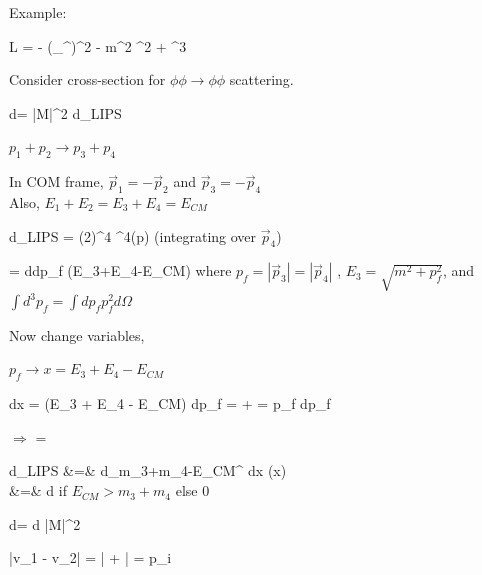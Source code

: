 {\lineacross

Example: 

\be
L = - (\partial_\mu \phi \partial^\mu \phi)^2 - m^2 \phi^2 + \phi^3
\ee

Consider cross-section for $\phi\phi\rightarrow\phi\phi$ scattering.

\be
d\sigma =  |M|^2 d\Pi_{LIPS}
\ee

$p_1 + p_2 \rightarrow p_3 + p_4$


In COM frame,  $\vec{p}_1 = -\vec{p}_2$ and $\vec{p}_3 = -\vec{p}_4$\\
Also, $E_1 + E_2 = E_3+E_4 = E_{CM}$

\be
d\Pi_{LIPS} = (2\pi)^4 \delta^4(\sum p)    
\ee
(integrating over $\vec{p}_4$)

\be
=  d\Omega \int dp_f   \delta(E_3+E_4-E_{CM})
\ee
where $p_f = |\vec{p}_3| = |\vec{p}_4|$ , $E_3 = \sqrt{m^2 + p_f^2}$, and $\int d^3p_f = \int dp_f p_f^2 d\Omega$

Now change variables, 

$p_f \rightarrow x = E_3 + E_4 - E_{CM}$

\be
dx = (E_3 + E_4 - E_{CM}) dp_f =  +   =  p_f dp_f
\ee

$\Rightarrow$
\be
{} = 
\ee


\bea
d\Pi_{LIPS} &=&  d\Omega \int_{m_3+m_4-E_{CM}}^{\infty} dx  \delta(x) \\ 
&=&  d\Omega {} \textrm{if $E_{CM} > m_3 + m_4$ else 0 }
\eea

\be
d\sigma =  d\Omega {} |M|^2
\ee

\be
|v_1 - v_2| = \left|   +  \right| = p_i 
\ee
}



